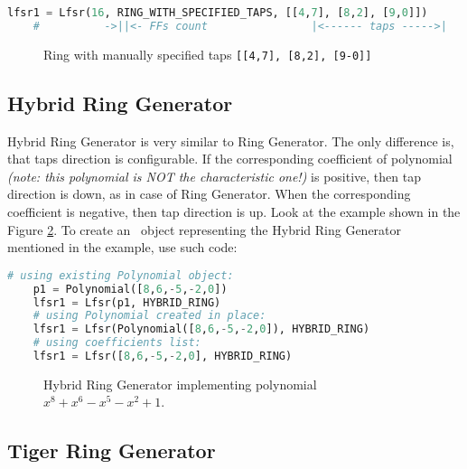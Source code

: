 \begin{lstlisting}[language=Python]
	lfsr1 = Lfsr(16, RING_WITH_SPECIFIED_TAPS, [[4,7], [8,2], [9,0]])
	#          ->||<- FFs count                |<------ taps ----->|
\end{lstlisting}

\begin{figure}[h]
	\centering
	\scalebox{.75}{}
	\caption{Ring with manually specified taps \texttt{[[4,7], [8,2], [9-0]]}}
	\label{lfsr:ringspecified}
\end{figure}

\subsection{Hybrid Ring Generator}


Hybrid Ring Generator is very similar to Ring Generator. The only difference is, that taps direction is configurable. If the corresponding coefficient of polynomial \textit{(note: this polynomial is NOT the characteristic one!)} is positive, then tap direction is down, as in case of Ring Generator. When the corresponding coefficient is negative, then tap direction is up. Look at the example shown in the Figure \ref{lfsr:hybridring}. To create an \Lfsr\ object representing the Hybrid Ring Generator mentioned in the example, use such code:

\begin{lstlisting}[language=Python]
	# using existing Polynomial object:
	p1 = Polynomial([8,6,-5,-2,0])
	lfsr1 = Lfsr(p1, HYBRID_RING)
	# using Polynomial created in place:
	lfsr1 = Lfsr(Polynomial([8,6,-5,-2,0]), HYBRID_RING)
	# using coefficients list:
	lfsr1 = Lfsr([8,6,-5,-2,0], HYBRID_RING)
\end{lstlisting}

\begin{figure}[h]
	\centering
	\scalebox{.75}{}
	\caption{Hybrid Ring Generator implementing polynomial $x^8+x^6-x^5-x^2+1$.}
	\label{lfsr:hybridring}
\end{figure}

\subsection{Tiger Ring Generator}



